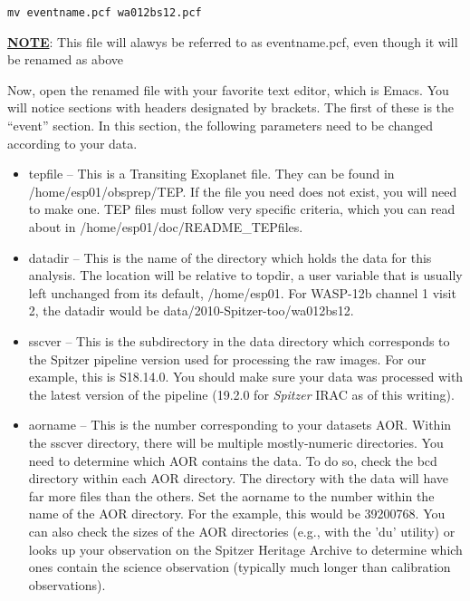 \documentclass[letterpaper,12pt]{article}
\begin{document}
\begin{verbatim}
mv eventname.pcf wa012bs12.pcf
\end{verbatim}

\noindent
{\underline{\bf NOTE}}: This file will alawys be referred to as
eventname.pcf, even though it will be renamed as above

Now, open the renamed file with your favorite text editor, which is
Emacs.  You will notice sections with headers designated by
brackets. The first of these is the ``event'' section. In this section,
the following parameters need to be changed according to your data.

\begin{itemize}
\item tepfile -- This is a Transiting Exoplanet file. They can be
  found in /home/esp01/obsprep/TEP. If the file you need does not
  exist, you will need to make one. TEP files must follow very
  specific criteria, which you can read about in
  /home/esp01/doc/README\_TEPfiles.

\item datadir -- This is the name of the directory which holds the
  data for this analysis. The location will be relative to topdir, a
  user variable that is usually left unchanged from its default,
  /home/esp01.  For WASP-12b channel 1 visit 2, the datadir would be
  data/2010-Spitzer-too/wa012bs12.

\item sscver -- This is the subdirectory in the data directory which
  corresponds to the Spitzer pipeline version used for processing the
  raw images. For our example, this is S18.14.0. You should make sure
  your data was processed with the latest version of the pipeline
  (19.2.0 for \textit{Spitzer} IRAC as of this writing).

\item aorname -- This is the number corresponding to your datasets
  AOR. Within the sscver directory, there will be multiple
  mostly-numeric directories.  You need to determine which AOR
  contains the data. To do so, check the bcd directory within each AOR
  directory. The directory with the data will have far more files than
  the others. Set the aorname to the number within the name of the AOR
  directory. For the example, this would be 39200768. You can also
  check the sizes of the AOR directories (e.g., with the 'du' utility)
  or looks up your observation on the Spitzer Heritage Archive to
  determine which ones contain the science observation (typically much
  longer than calibration observations).


\end{itemize}
\end{document}
